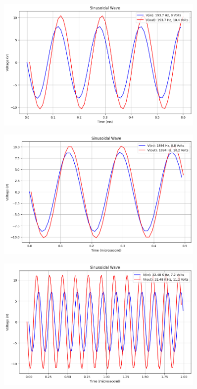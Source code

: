 \documentclass{article}
\begin{document}
\begin{figure}[H]
    \centering
    \includegraphics[width=0.9\textwidth]{./img/Lab3_4_1.png}  %
    \caption{}
    \label{fig:graph1}
\end{figure}

\begin{figure}[H]
    \centering
    \includegraphics[width=0.9\textwidth]{./img/Lab3_4_2.png}  %
    \caption{}
    \label{fig:graph1}
\end{figure}

\begin{figure}[H]
    \centering
    \includegraphics[width=0.9\textwidth]{./img/Lab3_4_3.png}  %
    \caption{}
    \label{fig:graph1}
\end{figure}
\end{document}
